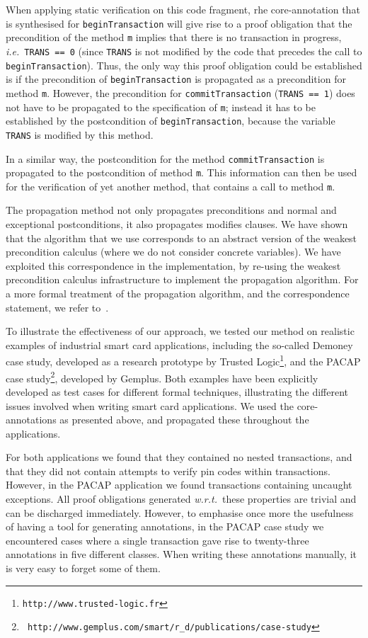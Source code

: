 When applying static verification on this code fragment, rhe
core-annotation that is synthesised for \texttt{beginTransaction} will
give rise to a proof obligation that the precondition of the method
\texttt{m} implies that there is no transaction in progress,
\emph{i.e.}\ \texttt{TRANS == 0} (since \texttt{TRANS} is not modified
by the code that precedes the call to 
\texttt{beginTransaction}). Thus, the only way this proof obligation
could be established is if the precondition of
\texttt{beginTransaction} is propagated as a precondition for method
\texttt{m}. However, the
precondition for \texttt{commitTransaction} (\texttt{TRANS == 1}) does
not have to be propagated to the specification of \texttt{m}; instead
it has to be established by the postcondition of
\texttt{begin\-Transaction}, because the variable \texttt{TRANS} is
modified by this method. 

In a similar way, the postcondition for the method
\texttt{commitTransaction} is propagated to the postcondition of
method \texttt{m}. This information can then be used for the
verification of yet another method, that contains a call to method
\texttt{m}. 

The propagation method not only propagates preconditions and normal
and exceptional postconditions, it also propagates modifies
clauses. We have shown that the algorithm that we use corresponds to
an abstract version of the weakest precondition calculus (where we do
not consider concrete variables). We have exploited this
correspondence in the implementation, by re-using the weakest
precondition calculus infrastructure to implement the propagation
algorithm. For a more formal treatment of the propagation algorithm, and
the correspondence statement, we refer to~\cite{PavlovaBBHL04cardis}. 

To illustrate the effectiveness of our approach, we tested our method on realistic examples of
industrial smart card applications, including the so-called Demoney
case study, developed as a research prototype by Trusted
Logic\footnote{{\tt http://www.trusted-logic.fr}}, and the PACAP case
study\footnote{{\tt
http://www.gemplus.com/smart/r\_d/publications/case-study}}, developed
by Gemplus. Both examples have been explicitly developed as test cases
for different formal techniques, illustrating the different issues
involved when writing smart card applications. We used the
core-annotations as presented above, and propagated these throughout
the applications.

For both applications we found that they contained no nested
transactions, and that they did not contain attempts to verify pin
codes within transactions. However, in the PACAP application we found
transactions containing uncaught exceptions. All proof obligations
generated \emph{w.r.t.}~these properties are trivial and can be
discharged immediately. However, to emphasise once more the usefulness
of having a tool for generating annotations, in the PACAP case study
we encountered cases where a single transaction gave rise to
twenty-three annotations in five different classes. When writing these
annotations manually, it is very easy to forget some of them.

